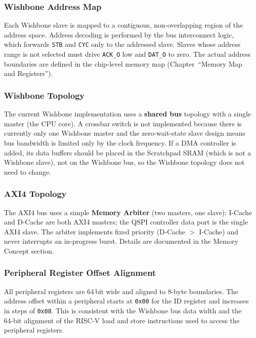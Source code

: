 \subsubsection{Wishbone Address Map}

Each Wishbone slave is mapped to a contiguous, non-overlapping region of
the address space.
Address decoding is performed by the bus interconnect logic, which
forwards \texttt{STB} and \texttt{CYC} only to the addressed slave.
Slaves whose address range is not selected must drive \texttt{ACK\_O}
low and \texttt{DAT\_O} to zero.
The actual address boundaries are defined in the chip-level memory map
(Chapter~``Memory Map and Registers'').

\subsubsection{Wishbone Topology}

The current Wishbone implementation uses a \textbf{shared bus} topology
with a single master (the CPU core).
A crossbar switch is not implemented because there is currently only one
Wishbone master and the zero-wait-state slave design means bus bandwidth
is limited only by the clock frequency.
If a DMA controller is added, its data buffers should be placed in the
Scratchpad SRAM (which is not a Wishbone slave), not on the Wishbone bus,
so the Wishbone topology does not need to change.

\subsubsection{AXI4 Topology}

The AXI4 bus uses a simple \textbf{Memory Arbiter} (two masters, one slave):
I-Cache and D-Cache are both AXI4 masters; the QSPI controller data port
is the single AXI4 slave.
The arbiter implements fixed priority (D-Cache $>$ I-Cache) and never
interrupts an in-progress burst.
Details are documented in the Memory Concept section.

\subsubsection{Peripheral Register Offset Alignment}

All peripheral registers are 64\,bit wide and aligned to 8-byte boundaries.
The address offset within a peripheral starts at \texttt{0x00} for the
ID register and increases in steps of \texttt{0x08}.
This is consistent with the Wishbone bus data width and the 64-bit
alignment of the RISC-V load and store instructions used to access the
peripheral registers.


